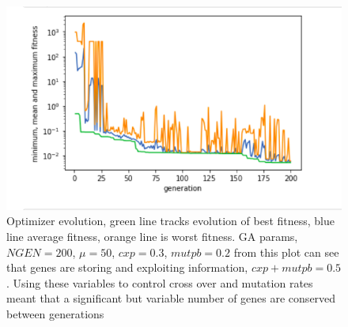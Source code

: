 \begin{figure}
    \centering
    \includegraphics[scale=0.7]{figures/optimizer_internal_validation}
    \caption[Optimizer error over generations]{Optimizer evolution, green line tracks evolution of best fitness, blue line average fitness, orange line is worst fitness. GA params, $NGEN=200$, $\mu=50$, $cxp=0.3$, $mutpb=0.2$ from this plot can see that genes are storing and exploiting information, $cxp+mutpb=0.5$. Using these variables to control cross over and mutation rates meant that a significant but variable number of genes are conserved between generations }
    \label{fig:my_label}
\end{figure}


